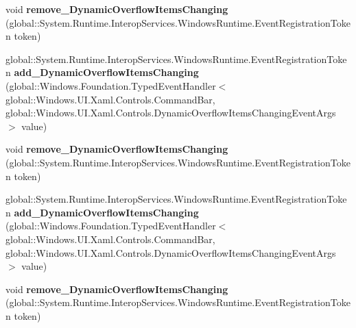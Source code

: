\begin{DoxyCompactItemize}
void {\bfseries remove\+\_\+\+Dynamic\+Overflow\+Items\+Changing} (global\+::\+System.\+Runtime.\+Interop\+Services.\+Windows\+Runtime.\+Event\+Registration\+Token token)
\item 
\mbox{\label{interface_windows_1_1_u_i_1_1_xaml_1_1_controls_1_1_i_command_bar3_abe3fd048f4c552dbed19dd3e2e6e563d}} 
global\+::\+System.\+Runtime.\+Interop\+Services.\+Windows\+Runtime.\+Event\+Registration\+Token {\bfseries add\+\_\+\+Dynamic\+Overflow\+Items\+Changing} (global\+::\+Windows.\+Foundation.\+Typed\+Event\+Handler$<$ global\+::\+Windows.\+U\+I.\+Xaml.\+Controls.\+Command\+Bar, global\+::\+Windows.\+U\+I.\+Xaml.\+Controls.\+Dynamic\+Overflow\+Items\+Changing\+Event\+Args $>$ value)
\item 
\mbox{\label{interface_windows_1_1_u_i_1_1_xaml_1_1_controls_1_1_i_command_bar3_a45e56795c020f83b9e93caf640a4736b}} 
void {\bfseries remove\+\_\+\+Dynamic\+Overflow\+Items\+Changing} (global\+::\+System.\+Runtime.\+Interop\+Services.\+Windows\+Runtime.\+Event\+Registration\+Token token)
\item 
\mbox{\label{interface_windows_1_1_u_i_1_1_xaml_1_1_controls_1_1_i_command_bar3_abe3fd048f4c552dbed19dd3e2e6e563d}} 
global\+::\+System.\+Runtime.\+Interop\+Services.\+Windows\+Runtime.\+Event\+Registration\+Token {\bfseries add\+\_\+\+Dynamic\+Overflow\+Items\+Changing} (global\+::\+Windows.\+Foundation.\+Typed\+Event\+Handler$<$ global\+::\+Windows.\+U\+I.\+Xaml.\+Controls.\+Command\+Bar, global\+::\+Windows.\+U\+I.\+Xaml.\+Controls.\+Dynamic\+Overflow\+Items\+Changing\+Event\+Args $>$ value)
\item 
\mbox{\label{interface_windows_1_1_u_i_1_1_xaml_1_1_controls_1_1_i_command_bar3_a45e56795c020f83b9e93caf640a4736b}} 
void {\bfseries remove\+\_\+\+Dynamic\+Overflow\+Items\+Changing} (global\+::\+System.\+Runtime.\+Interop\+Services.\+Windows\+Runtime.\+Event\+Registration\+Token token)
\item 
\mbox{\label{interface_windows_1_1_u_i_1_1_xaml_1_1_controls_1_1_i_command_bar3_abe3fd048f4c552dbed19dd3e2e6e563d}} 

\end{DoxyCompactItemize}
